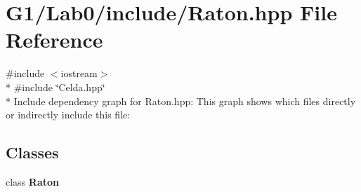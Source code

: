 \section{G1/\+Lab0/include/\+Raton.hpp File Reference}
\label{_raton_8hpp}
{\ttfamily \#include $<$iostream$>$}\\*
{\ttfamily \#include \char`\"{}Celda.\+hpp\char`\"{}}\\*
Include dependency graph for Raton.\+hpp\+:
This graph shows which files directly or indirectly include this file\+:
\subsection*{Classes}
\begin{DoxyCompactItemize}
\item 
class {\bf Raton}
\end{DoxyCompactItemize}
